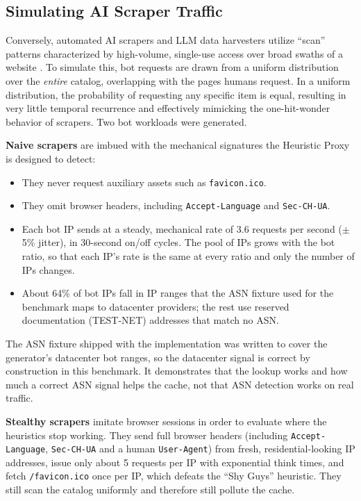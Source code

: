 \subsection{Simulating AI Scraper Traffic}
Conversely, automated AI scrapers and LLM data harvesters utilize ``scan'' patterns characterized by high-volume, single-use access over broad swaths of a website \cite{zhang_rethinking_2026}. To simulate this, bot requests are drawn from a uniform distribution over the \emph{entire} catalog, overlapping with the pages humans request. In a uniform distribution, the probability of requesting any specific item is equal, resulting in very little temporal recurrence and effectively mimicking the one-hit-wonder behavior of scrapers. Two bot workloads were generated.

\textbf{Naive scrapers} are imbued with the mechanical signatures the Heuristic Proxy is designed to detect:
\begin{itemize}
    \item They never request auxiliary assets such as \texttt{favicon.ico}.
    \item They omit browser headers, including \texttt{Accept-Language} and \texttt{Sec-CH-UA}.
    \item Each bot IP sends at a steady, mechanical rate of 3.6 requests per second ($\pm$5\% jitter), in 30-second on/off cycles. The pool of IPs grows with the bot ratio, so that each IP's rate is the same at every ratio and only the number of IPs changes.
    \item About 64\% of bot IPs fall in IP ranges that the ASN fixture used for the benchmark maps to datacenter providers; the rest use reserved documentation (TEST-NET) addresses that match no ASN.
\end{itemize}

The ASN fixture shipped with the implementation was written to cover the generator's datacenter bot ranges, so the datacenter signal is correct by construction in this benchmark. It demonstrates that the lookup works and how much a correct ASN signal helps the cache, not that ASN detection works on real traffic.

\textbf{Stealthy scrapers} imitate browser sessions in order to evaluate where the heuristics stop working. They send full browser headers (including \texttt{Accept-Language}, \texttt{Sec-CH-UA} and a human \texttt{User-Agent}) from fresh, residential-looking IP addresses, issue only about 5 requests per IP with exponential think times, and fetch \texttt{/favicon.ico} once per IP, which defeats the ``Shy Guys'' heuristic. They still scan the catalog uniformly and therefore still pollute the cache.


